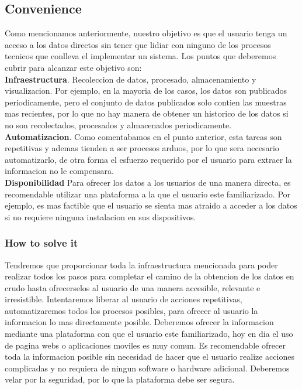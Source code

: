 \subsection{Convenience}
Como mencionamos anteriormente, nuestro objetivo es que el usuario tenga un acceso a los datos directos sin tener que lidiar con ninguno
de los procesos tecnicos que conlleva el implementar un sistema. Los puntos que deberemos cubrir para alcanzar este objetivo son:\\

\textbf{Infraestructura}. Recoleccion de datos, procesado, almacenamiento y visualizacion. Por ejemplo, en la mayoria de los casos, los datos son 
publicados periodicamente, pero el conjunto de datos publicados solo contien las muestras mas recientes, por lo que no hay manera de obtener 
un historico de los datos si no son recolectados, procesados y almacenados periodicamente. \\

\textbf{Automatizacion}. Como comentabamos en el punto anterior, esta tareas son repetitivas y ademas tienden a ser procesos arduos, por lo que sera
necesario automatizarlo, de otra forma el esfuerzo requerido por el usuario para extraer la informacion no le compensara. \\

\textbf{Disponibilidad} Para ofrecer los datos a los usuarios de una manera directa, es recomendable utilizar una plataforma a la que el usuario
este familiarizado. Por ejemplo, es mas factible que el usuario se sienta mas atraido a acceder a los datos si no requiere
ninguna instalacion en sus dispositivos.\\

\subsubsection{How to solve it} 
Tendremos que proporcionar toda la infraestructura mencionada para poder realizar todos los pasos para completar el camino de la obtencion de los
datos en crudo hasta ofrecerselos al usuario de una manera accesible, relevante e irresistible.
Intentaremos liberar al usuario de acciones repetitivas, automatizaremos todos los procesos posibles, para ofrecer al usuario la informacion lo mas
directamente posible.
Deberemos ofrecer la informacion mediante una plataforma con que el usuario este familiarizado, hoy en dia el uso de pagina webs o aplicaciones moviles es muy comun.
Es recomendable ofrecer toda la informacion posible sin necesidad de hacer que el usuario realize acciones complicadas y no requiera de ningun software o hardware adicional.
Deberemos velar por la seguridad, por lo que la plataforma debe ser segura.


